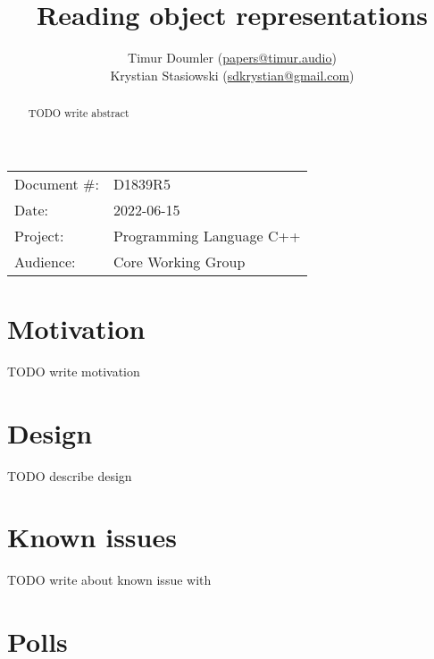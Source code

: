 

\newcommand{\forceindent}{\parindent=1em\indent\parindent=0pt\relax} %


\title{Reading object representations}
\author{
  Timur Doumler \small(\href{mailto:papers@timur.audio}{papers@timur.audio}) \\
  Krystian Stasiowski \small(\href{mailto:sdkrystian@gmail.com}{sdkrystian@gmail.com})
}
\date{}
\maketitle

\begin{tabular}{ll}
Document \#: & D1839R5 \\
Date: & 2022-06-15\\
Project: & Programming Language C++ \\
Audience: & Core Working Group
\end{tabular}


\begin{abstract}
TODO write abstract
\end{abstract}

\section{Motivation}
\label{sec:motivation}

TODO write motivation

\section{Design}
\label{sec:design}

TODO describe design

\section{Known issues}
\label{sec:issues}

TODO write about known issue with 

\section {Polls}
\label{sec:polls}

